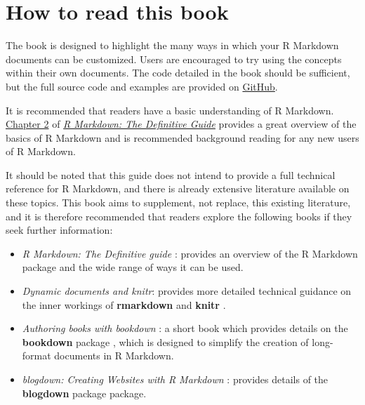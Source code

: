 \documentclass[]{book}
\providecommand{\tightlist}{%
  \setlength{\itemsep}{0pt}\setlength{\parskip}{0pt}}
\theoremstyle{definition}
\theoremstyle{definition}
\theoremstyle{definition}
\theoremstyle{remark}
\begin{document}
\hypertarget{how-to-read-this-book}{%
\section*{How to read this book}\label{how-to-read-this-book}}

The book is designed to highlight the many ways in which your R Markdown
documents can be customized. Users are encouraged to try using the
concepts within their own documents. The code detailed in the book
should be sufficient, but the full source code and examples are provided
on \href{https://github.com/mikey-harper/rmarkdown-cookbook}{GitHub}.

It is recommended that readers have a basic understanding of R Markdown.
\href{https://bookdown.org/yihui/rmarkdown/basics.html}{Chapter 2} of
\href{https://bookdown.org/yihui/rmarkdown/}{\emph{R Markdown: The
Definitive Guide}} \citep{xie2018} provides a great overview of the
basics of R Markdown and is recommended background reading for any new
users of R Markdown.

It should be noted that this guide does not intend to provide a full
technical reference for R Markdown, and there is already extensive
literature available on these topics. This book aims to supplement, not
replace, this existing literature, and it is therefore recommended that
readers explore the following books if they seek further information:

\begin{itemize}
\tightlist
\item
  \emph{R Markdown: The Definitive guide} \citep{xie2018}: provides an
  overview of the R Markdown package and the wide range of ways it can
  be used.
\item
  \emph{Dynamic documents and knitr}: provides more detailed technical
  guidance on the inner workings of \textbf{rmarkdown} and
  \textbf{knitr} \citep{R-knitr}.
\item
  \emph{Authoring books with bookdown} \citep{xie2016bookdown}: a short
  book which provides details on the \textbf{bookdown} package
  \citep{R-bookdown}, which is designed to simplify the creation of
  long-format documents in R Markdown.
\item
  \emph{blogdown: Creating Websites with R Markdown}
  \citep{xie2017blogdown}: provides details of the \textbf{blogdown}
  package \citep{R-blogdown} package.
\end{itemize}
\end{document}
